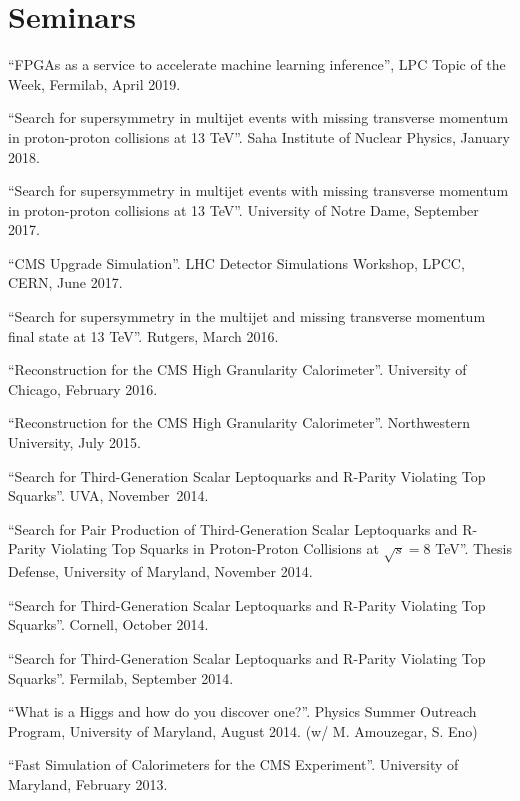 \section{Seminars}
\begin{description}[leftmargin=12pt,font=\normalfont,labelsep=0em]
\item ``FPGAs as a service to accelerate machine learning inference'', LPC Topic of the Week, Fermilab, April 2019.
\item ``Search for supersymmetry in multijet events with missing transverse momentum in proton-proton collisions at 13 TeV''. Saha Institute of Nuclear Physics, January 2018.
\item ``Search for supersymmetry in multijet events with missing transverse momentum in proton-proton collisions at 13 TeV''. University of Notre Dame, September 2017.
\item ``CMS Upgrade Simulation''. LHC Detector Simulations Workshop, LPCC, CERN, June 2017.
\item ``Search for supersymmetry in the multijet and missing transverse momentum final state at 13 TeV''. Rutgers, March 2016.
\item ``Reconstruction for the CMS High Granularity Calorimeter''. University of Chicago, February 2016.
\item ``Reconstruction for the CMS High Granularity Calorimeter''. Northwestern University, July 2015.
\item ``Search for Third-Generation Scalar Leptoquarks and R-Parity Violating Top Squarks''. UVA, November~2014.
\item ``Search for Pair Production of Third-Generation Scalar Leptoquarks and R-Parity Violating Top Squarks in Proton-Proton Collisions at $\sqrt{s}=8$ TeV''. Thesis Defense, University of Maryland, November 2014.
\item ``Search for Third-Generation Scalar Leptoquarks and R-Parity Violating Top Squarks''. Cornell, October 2014.
\item ``Search for Third-Generation Scalar Leptoquarks and R-Parity Violating Top Squarks''. Fermilab, September 2014.
\item ``What is a Higgs and how do you discover one?''. Physics Summer Outreach Program, University of Maryland, August 2014. (w/ M. Amouzegar, S. Eno)
\item ``Fast Simulation of Calorimeters for the CMS Experiment''. University of Maryland, February 2013.
\end{description}

